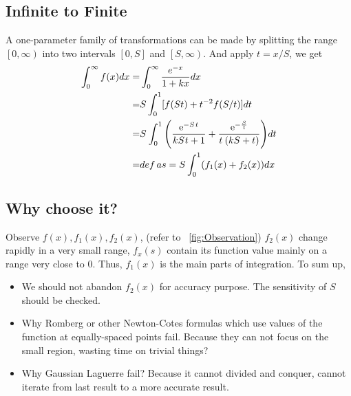 \documentclass[
10pt, %
a4paper, %
oneside, %
headinclude,footinclude, %
BCOR5mm, %
]{scrartcl}
\theoremstyle{definition}
\begin{document}
\subsection{Infinite to Finite}
A one-parameter family of transformations can be made by splitting the range $\left[0,\infty \right)$ into two intervals $\left[0,S\right]$ and $\left[S, \infty \right)$. And apply $t=x/S$, we get
\begin{align}
 \int_{0} ^{\infty}f(x)dx =& \int_{0} ^{\infty}\frac{e^{-x}}{1+kx}dx  \\
=& S \int _{0} ^{1} [f(St)+t^{-2}f(S/t)]dt\\
=& S{\mkern 1mu} \int_0^1 {\left( {\frac{{{{\rm{e}}^{ - S{\kern 1pt} t}}}}{{kS{\mkern 1mu} t + 1}} + \frac{{{{\rm{e}}^{ - \frac{S}{t}}}}}{{t{\mkern 1mu} \left( {kS + t} \right)}}} \right)} dt\\
=&def \, as = S \int _{0} ^{1} (f_1(x)+f_2(x))dx
\end{align}
\subsection{Why choose it?}
Observe $f(x), f_1(x),f_2(x)$, (refer to ~\vref{fig:Observation}) $f_2(x) $ change rapidly in a very small range, $f_x(s)$ contain its function value mainly on a range very close to 0. Thus, $f_1(x)$ is the main parts of integration. To sum up,
\begin{itemize}
  \item We should not abandon $f_2(x)$ for accuracy purpose. The sensitivity of $S$ should be checked.
  \item Why Romberg or other  Newton-Cotes formulas which use values of the function at equally-spaced points fail. Because they can not focus on the small region, wasting time on trivial things?
  \item Why Gaussian Laguerre fail? Because it cannot divided and conquer, cannot iterate from last result to a more accurate result.
\end{itemize}
\end{document}
